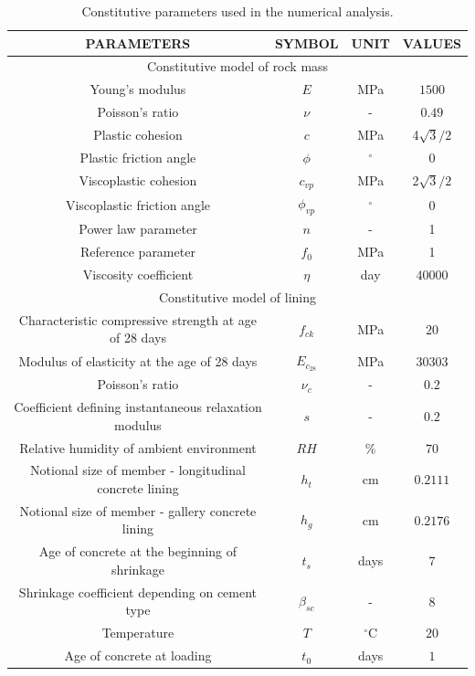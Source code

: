 \documentclass[Journal,letterpaper, NoLists,SectionNumbers]{ascelike-new}
\begin{document}
\begin{table}[h!]
	\caption{Constitutive parameters used in the numerical analysis.}
	\label{table2}
	\centering
	\renewcommand{\arraystretch}{1.25}
	\begin{tabular}{c c c c}
		\hline
		\multicolumn{1}{c}{PARAMETERS} &
		\multicolumn{1}{c}{SYMBOL} &
		\multicolumn{1}{c}{UNIT} &
		\multicolumn{1}{c}{VALUES} \\
		\hline
		\multicolumn{4}{c}{Constitutive model of rock mass} \\
		\hline
		Young's modulus & $E$ & MPa & $1500$ \\
		Poisson's ratio & $\nu$ & - & $0.49$ \\
		Plastic cohesion & $c$ & MPa & 4$\sqrt{3}/2$ \\
		Plastic friction angle & $\phi$ & $^{\circ}$ & 0 \\
		Viscoplastic cohesion & $c_{vp}$ & MPa & 2$\sqrt{3}/2$ \\
		Viscoplastic friction angle & $\phi_{vp}$ & $^{\circ}$ & 0 \\
		Power law parameter & $n$ & - & 1 \\
		Reference parameter & $f_0$ & MPa & 1 \\
		Viscosity coefficient & $\eta$ & day & $40000$ \\
		\hline
		\multicolumn{4}{c}{Constitutive model of lining} \\
		\hline
		
		Characteristic compressive strength at age of 28 days & $f_{ck}$ & MPa & $20$ \\
		Modulus of elasticity at the age of 28 days & $E_{c_{28}}$ & MPa & $30303$ \\
		Poisson's ratio & $\nu_c$ & - & $0.2$ \\
		
		Coefficient defining instantaneous relaxation modulus \citeyear{CEB:1993} & $s$ & - & $0.2$ \\
		Relative humidity of ambient environment & $RH$ & \% & $70$ \\
		Notional size of member - longitudinal concrete lining & $h_t$ & cm & $0.2111$ \\
		Notional size of member - gallery concrete lining & $h_{g}$ & cm & $0.2176$ \\
		Age of concrete at the beginning of shrinkage & $t_s$ & days & $7$ \\
		Shrinkage coefficient depending on cement type \citeyear{CEB:1993} & $\beta_{sc}$ & - & $8$ \\
		Temperature & $T$ & $^\circ$C & $20$ \\
		Age of concrete at loading & $t_0$ & days & $1$ \\
		\hline
	\end{tabular}
	\normalsize
\end{table}
\end{document}
